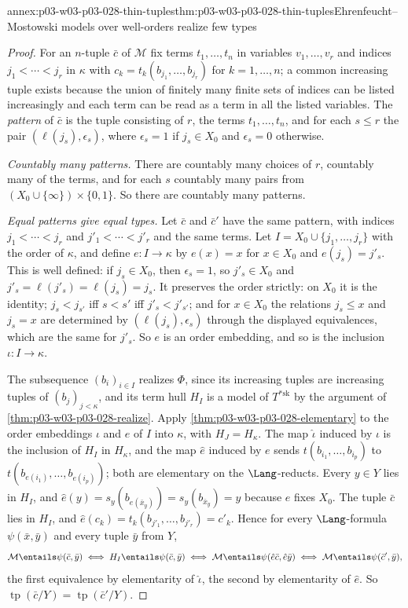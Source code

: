 \begin{annexitem}{annex:p03-w03-p03-028-thin-tuples}{thm:p03-w03-p03-028-thin-tuples}{Ehrenfeucht--Mostowski models over well-orders realize few types}
\begin{proof}
For an \(n\)-tuple \(\bar c\) of \(\mathcal M\) fix terms
\(t_1,\ldots,t_n\) in variables \(v_1,\ldots,v_r\) and indices
\(j_1<\cdots<j_r\) in \(\kappa\) with
\(c_k=t_k(b_{j_1},\ldots,b_{j_r})\) for \(k=1,\ldots,n\); a common
increasing tuple exists because the union of finitely many finite sets of
indices can be listed increasingly and each term can be read as a term in
all the listed variables.  The \emph{pattern} of \(\bar c\) is the tuple
consisting of \(r\), the terms \(t_1,\ldots,t_n\), and for each
\(s\leq r\) the pair \((\ell(j_s),\epsilon_s)\), where \(\epsilon_s=1\) if
\(j_s\in X_0\) and \(\epsilon_s=0\) otherwise.

\emph{Countably many patterns.}  There are countably many choices of
\(r\), countably many of the terms, and for each \(s\) countably many pairs
from \((X_0\cup\{\infty\})\times\{0,1\}\).  So there are countably many
patterns.

\emph{Equal patterns give equal types.}  Let \(\bar c\) and \(\bar c'\)
have the same pattern, with indices \(j_1<\cdots<j_r\) and
\(j'_1<\cdots<j'_r\) and the same terms.  Let
\(I=X_0\cup\{j_1,\ldots,j_r\}\) with the order of \(\kappa\), and define
\(e\colon I\to\kappa\) by \(e(x)=x\) for \(x\in X_0\) and \(e(j_s)=j'_s\).
This is well defined: if \(j_s\in X_0\), then \(\epsilon_s=1\), so
\(j'_s\in X_0\) and \(j'_s=\ell(j'_s)=\ell(j_s)=j_s\).  It preserves the
order strictly: on \(X_0\) it is the identity; \(j_s<j_{s'}\) iff
\(s<s'\) iff \(j'_s<j'_{s'}\); and for \(x\in X_0\) the relations
\(j_s\leq x\) and \(j_s=x\) are determined by \((\ell(j_s),\epsilon_s)\)
through the displayed equivalences, which are the same for \(j'_s\).  So
\(e\) is an order embedding, and so is the inclusion
\(\iota\colon I\to\kappa\).

The subsequence \((b_i)_{i\in I}\) realizes \(\Phi\), since its increasing
tuples are increasing tuples of \((b_j)_{j<\kappa}\), and its term hull
\(H_I\) is a model of \(T^{*\mathrm{sk}}\) by the argument of
\cref{thm:p03-w03-p03-028-realize}.  Apply
\cref{thm:p03-w03-p03-028-elementary} to the order embeddings \(\iota\)
and \(e\) of \(I\) into \(\kappa\), with \(H_J=H_\kappa\).  The map
\(\hat\iota\) induced by \(\iota\) is the inclusion of \(H_I\) in
\(H_\kappa\), and the map \(\hat e\) induced by \(e\) sends
\(t(b_{i_1},\ldots,b_{i_p})\) to \(t(b_{e(i_1)},\ldots,b_{e(i_p)})\); both
are elementary on the \(\Lang\)-reducts.  Every \(y\in Y\) lies in \(H_I\),
and \(\hat e(y)=s_y(b_{e(\bar x_y)})=s_y(b_{\bar x_y})=y\) because \(e\)
fixes \(X_0\).  The tuple \(\bar c\) lies in \(H_I\), and
\(\hat e(c_k)=t_k(b_{j'_1},\ldots,b_{j'_r})=c'_k\).  Hence for every
\(\Lang\)-formula \(\psi(\bar x,\bar y)\) and every tuple \(\bar y\) from
\(Y\),
\[
 \mathcal M\entails\psi(\bar c,\bar y)
 \iff H_I\entails\psi(\bar c,\bar y)
 \iff \mathcal M\entails\psi(\hat e\bar c,\hat e\bar y)
 \iff \mathcal M\entails\psi(\bar c',\bar y),
\]
the first equivalence by elementarity of \(\hat\iota\), the second by
elementarity of \(\hat e\).  So
\(\operatorname{tp}(\bar c/Y)=\operatorname{tp}(\bar c'/Y)\).


\end{proof}
\end{annexitem}
